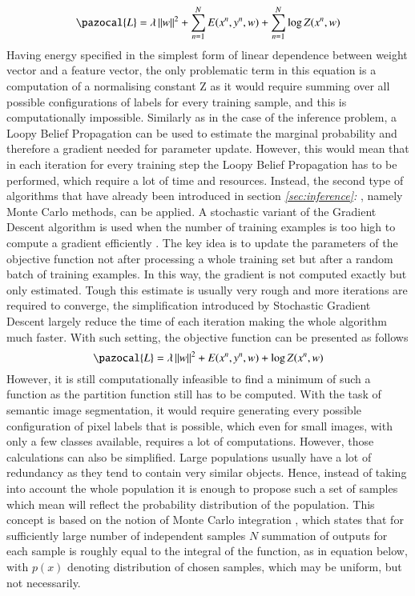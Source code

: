 \begin{equation}
    \label{eq:regularisation_prob}
    \pazocal{L} = \lambda \left \| w \right \|^2 + \sum_{n=1}^{N}{E(x^n,y^n,w)} + \sum_{n=1}^{N}{\log{Z}(x^n,w)}
\end{equation}
Having energy specified in the simplest form of linear dependence between weight vector and a feature vector, the only problematic term in this equation is a computation of a normalising constant Z as it would require summing over all possible configurations of labels for every training sample, and this is computationally impossible. Similarly as in the case of the inference problem, a Loopy Belief Propagation can be used to estimate the marginal probability and therefore a gradient needed for parameter update. However, this would mean that in each iteration for every training step the Loopy Belief Propagation has to be performed, which require a lot of time and resources. Instead, the second type of algorithms that have already been introduced in section \textit{\ref{sec:inference}: }, namely Monte Carlo methods, can be applied. A stochastic variant of the Gradient Descent algorithm is used when the number of training examples is too high to compute a gradient efficiently \cite{optimisation_curtis}. The key idea is to update the parameters of the objective function not after processing a whole training set but after a random batch of training examples. In this way, the gradient is not computed exactly but only estimated. Tough this estimate is usually very rough and more iterations are required to converge, the simplification introduced by Stochastic Gradient Descent largely reduce the time of each iteration making the whole algorithm much faster. With such setting, the objective function can be presented as follows
\begin{equation}
    \pazocal{L} = \lambda \left \| w \right \|^2 + E(x^n,y^n,w) + \log{Z}(x^n,w)
\end{equation}
However, it is still computationally infeasible to find a minimum of such a function as the partition function still has to be computed. With the task of semantic image segmentation, it would require generating every possible configuration of pixel labels that is possible, which even for small images, with only a few classes available, requires a lot of computations. However, those calculations can also be simplified. Large populations usually have a lot of redundancy as they tend to contain very similar objects. Hence, instead of taking into account the whole population it is enough to propose such a set of samples which mean will reflect the probability distribution of the population. This concept is based on the notion of Monte Carlo integration \cite{bayesian_statistics}, which states that for sufficiently large number of independent samples $N$ summation of outputs for each sample is roughly equal to the integral of the function, as in equation below, with $p(x)$ denoting distribution of chosen samples, which may be uniform, but not necessarily.

